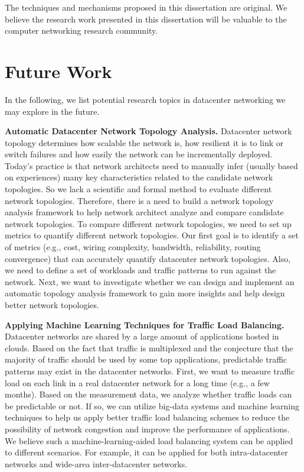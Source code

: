 The techniques and mechanisms proposed in this dissertation are original. 
We believe the research work presented in this dissertation will be valuable to 
the computer networking research community.

\section{Future Work}
In the following, we list potential research topics in datacenter networking we may explore in the future.

{\bf Automatic Datacenter Network Topology Analysis.}
Datacenter network topology determines how scalable the network is,
how resilient it is to link or switch failures and how easily the network
can be incrementally deployed. Today's practice is that network architects need to
manually infer (usually based on experiences) many key characteristics related to
the candidate network topologies. So we lack a scientific and formal method to
evaluate different network topologies. Therefore, there is a need to build a network
topology analysis framework to help network architect analyze and compare
candidate network topologies. To compare different network topologies, we need to
set up metrics to quantify different network topologies. Our first goal is to
identify a set of metrics (e.g., cost, wiring complexity, bandwidth, reliability, routing convergence) that
can accurately quantify datacenter network topologies.  Also, we need to define a set of workloads
and traffic patterns to run against the network. 
Next, we want to investigate whether we can design and implement
an automatic topology analysis framework to gain more insights and help design better network topologies.

{\bf Applying Machine Learning Techniques for Traffic Load Balancing.}
Datacenter networks are shared by a large amount of applications hosted in clouds. 
Based on the fact that traffic is multiplexed and the conjecture that the majority of traffic 
should be used by some top applications, predictable traffic patterns may 
exist in the datacenter networks. First, we want to measure traffic load on each link 
in a real datacenter network for a long time (e.g., a few months). Based on the measurement data, 
we analyze whether traffic loads can be predictable or not. If so, we can utilize 
big-data systems and machine learning techniques to help us apply better traffic load 
balancing schemes to reduce the possibility of network congestion and improve the 
performance of applications. We believe such a machine-learning-aided load balancing 
system can be applied to different scenarios. For example, it can be applied for 
both intra-datacenter networks and wide-area inter-datacenter networks.

